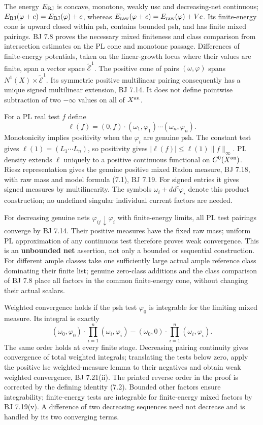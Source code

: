 \documentclass[
  10pt,
]{article}
\begin{document}
The energy \(E_{\rm BJ}\) is concave, monotone, weakly usc and
decreasing-net continuous;
\(E_{\rm BJ}(\varphi+c)=E_{\rm BJ}(\varphi)+c\), whereas
\(E_{\rm raw}(\varphi+c)=E_{\rm raw}(\varphi)+Vc\). Its finite-energy
cone is upward closed within psh, contains bounded psh, and has finite
mixed pairings. BJ 7.8 proves the necessary mixed finiteness and class
comparison from intersection estimates on the PL cone and monotone
passage. Differences of finite-energy potentials, taken on the
linear-growth locus where their values are finite, span a vector space
\(\widetilde{\mathcal E}^1\). The positive cone of pairs
\((\omega,\varphi)\) spans \(N^1(X)\times\widetilde{\mathcal E}^1\). Its
symmetric positive multilinear pairing consequently has a unique signed
multilinear extension, BJ 7.14. It does not define pointwise subtraction
of two \(-\infty\) values on all of \(X^{\rm an}\).

For a PL real test \(f\) define
\[\ell(f)=(0,f)\cdot(\omega_1,\varphi_1)\cdots(\omega_n,\varphi_n).\]
Monotonicity implies positivity when the \(\varphi_i\) are genuine psh.
The constant test gives \(\ell(1)=(L_1\cdots L_n)\), so positivity gives
\(|\ell(f)|\le\ell(1)\|f\|_\infty\). PL density extends \(\ell\)
uniquely to a positive continuous functional on \(C^0(X^{\rm an})\).
Riesz representation gives the genuine positive mixed Radon measure, BJ
7.18, with raw mass and model formula (7.1), BJ 7.19. For signed entries
it gives signed measures by multilinearity. The symbols
\(\omega_i+dd^c\varphi_i\) denote this product construction; no
undefined singular individual current factors are needed.

For decreasing genuine nets \(\varphi_{ij}\downarrow\varphi_i\) with
finite-energy limits, all PL test pairings converge by BJ 7.14. Their
positive measures have the fixed raw mass; uniform PL approximation of
any continuous test therefore proves weak convergence. This is an
\textbf{unbounded net} assertion, not only a bounded or sequential
construction. For different ample classes take one sufficiently large
actual ample reference class dominating their finite list; genuine
zero-class additions and the class comparison of BJ 7.8 place all
factors in the common finite-energy cone, without changing their actual
scalars.

Weighted convergence holds if the psh test \(\varphi_0\) is integrable
for the limiting mixed measure. Its integral is exactly \[
 (\omega_0,\varphi_0)\cdot\prod_{i=1}^n(\omega_i,\varphi_i)
 -(\omega_0,0)\cdot\prod_{i=1}^n(\omega_i,\varphi_i).
 \tag{7.2}
\] The same order holds at every finite stage. Decreasing pairing
continuity gives convergence of total weighted integrals; translating
the tests below zero, apply the positive lsc weighted-measure lemma to
their negatives and obtain weak weighted convergence, BJ 7.21(ii). The
printed reverse order in the proof is corrected by the defining identity
(7.2). Bounded other factors ensure integrability; finite-energy tests
are integrable for finite-energy mixed factors by BJ 7.19(v). A
difference of two decreasing sequences need not decrease and is handled
by its two converging terms.
\end{document}
